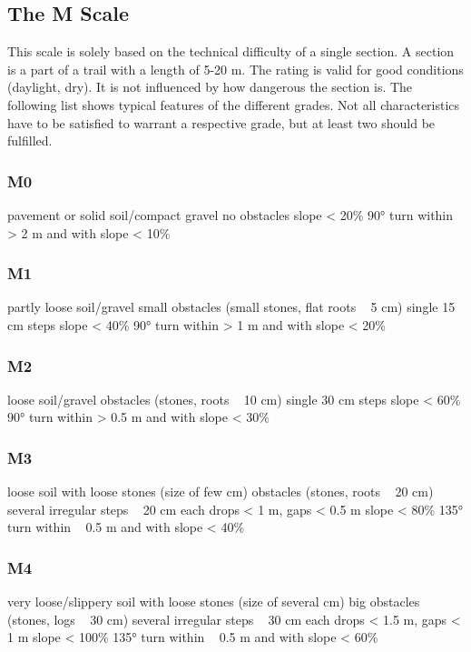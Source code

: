 \subsection{The M Scale}

This scale is solely based on the technical difficulty of a single section. A
section is a part of a trail with a length of 5-20 m. The rating is valid for
good conditions (daylight, dry). It is not influenced by how dangerous the
section is. The following list shows typical features of the different grades.
Not all characteristics have to be satisfied to warrant a respective grade, but
at least two should be fulfilled.

\subsubsection{M0}
pavement or solid soil/compact gravel
no obstacles
slope < 20\%
90° turn within > 2 m and with slope < 10\%

\subsubsection{M1}
partly loose soil/gravel
small obstacles (small stones, flat roots ~ 5 cm)
single 15 cm steps
slope < 40\%
90° turn within > 1 m and with slope < 20\%

\subsubsection{M2}
loose soil/gravel
obstacles (stones, roots ~ 10 cm)
single 30 cm steps
slope < 60\%
90° turn within > 0.5 m and with slope < 30\%

\subsubsection{M3}
loose soil with loose stones (size of few cm)
obstacles (stones, roots ~ 20 cm)
several irregular steps ~ 20 cm each
drops < 1 m, gaps < 0.5 m
slope < 80\%
135° turn within ~ 0.5 m and with slope < 40\%

\subsubsection{M4}
very loose/slippery soil with loose stones (size of several cm)
big obstacles (stones, logs ~ 30 cm)
several irregular steps ~ 30 cm each
drops < 1.5 m, gaps < 1 m
slope < 100\%
135° turn within ~ 0.5 m and with slope < 60\%


